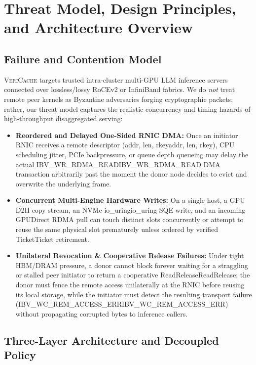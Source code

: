 \documentclass[11pt,a4paper]{article}
\let\origunderscore\_
\DeclareRobustCommand{\code}[1]{{\ttfamily\ifmmode #1\else\def\_{\origunderscore\hspace{0pt}}#1\fi}}
\newcommand{\VC}{\textsc{VeriCache}}
\begin{document}
\section{Threat Model, Design Principles, and Architecture Overview}
\label{sec:arch}

\subsection{Failure and Contention Model}

\VC{} targets trusted intra-cluster multi-GPU LLM inference servers connected over lossless/lossy RoCEv2 or InfiniBand fabrics. We do \emph{not} treat remote peer kernels as Byzantine adversaries forging cryptographic packets; rather, our threat model captures the realistic concurrency and timing hazards of high-throughput disaggregated serving:
\begin{itemize}
  \item \textbf{Reordered and Delayed One-Sided RNIC DMA:} Once an initiator RNIC receives a remote descriptor (\code{addr, len, rkey}), CPU scheduling jitter, PCIe backpressure, or queue depth queueing may delay the actual \code{IBV\_WR\_RDMA\_READ} DMA transaction arbitrarily past the moment the donor node decides to evict and overwrite the underlying frame.
  \item \textbf{Concurrent Multi-Engine Hardware Writes:} On a single host, a GPU D2H copy stream, an NVMe \code{io\_uring} SQE write, and an incoming GPUDirect RDMA pull can touch distinct slots concurrently or attempt to reuse the same physical slot prematurely unless ordered by verified \code{Ticket} retirement.
  \item \textbf{Unilateral Revocation \& Cooperative Release Failures:} Under tight HBM/DRAM pressure, a donor cannot block forever waiting for a straggling or stalled peer initiator to return a cooperative \code{ReadRelease}; the donor must fence the remote access unilaterally at the RNIC before reusing its local storage, while the initiator must detect the resulting transport failure (\code{IBV\_WC\_REM\_ACCESS\_ERR}) without propagating corrupted bytes to inference callers.
\end{itemize}

\subsection{Three-Layer Architecture and Decoupled Policy}
\end{document}
